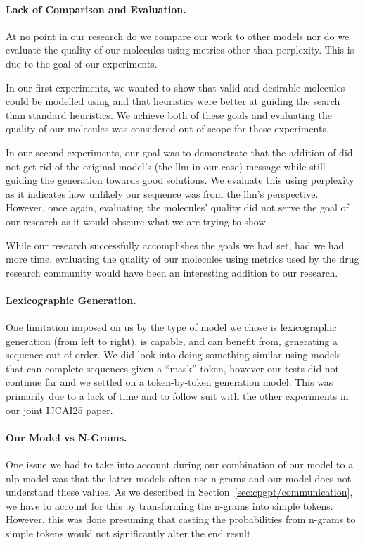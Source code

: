 \documentclass[../Document.tex]{subfiles}
\begin{document}
\paragraph{Lack of Comparison and Evaluation.}
At no point in our research do we compare our work to other models nor do we evaluate the quality of our molecules using metrics other than perplexity.
This is due to the goal of our experiments.

In our first experiments, we wanted to show that valid and desirable molecules could be modelled using \cp and that \bp heuristics were better at guiding the search than standard \cp heuristics.
We achieve both of these goals and evaluating the quality of our molecules was considered out of scope for these experiments.

In our second experiments, our goal was to demonstrate that the addition of \cp did not get rid of the original model's (the \gls{llm} in our case) message while still guiding the generation towards good solutions. 
We evaluate this using perplexity as it indicates how unlikely our sequence was from the \gls{llm}'s perspective.
However, once again, evaluating the molecules' quality did not serve the goal of our research as it would obscure what we are trying to show.

While our research successfully accomplishes the goals we had set, had we had more time, evaluating the quality of our molecules using metrics used by the drug research community would have been an interesting addition to our research.


\paragraph{Lexicographic Generation.}
One limitation imposed on us by the type of model we chose is lexicographic generation (\ie from left to right).
\cp is capable, and can benefit from, generating a sequence out of order.
We did look into doing something similar using models that can complete sequences given a ``mask'' token, however our tests did not continue far and we settled on a token-by-token generation model.
This was primarily due to a lack of time and to follow suit with the other experiments in our joint IJCAI25 paper.


\paragraph{Our \cp Model vs N-Grams.}
One issue we had to take into account during our combination of our \cp model to a \gls{nlp} model was that the latter models often use n-grams and our \cp model does not understand these values.
As we described in Section~\ref{sec:cpgpt/communication}, we have to account for this by transforming the n-grams into simple tokens.
However, this was done presuming that casting the probabilities from n-grams to simple tokens would not significantly alter the end result.
\end{document}
